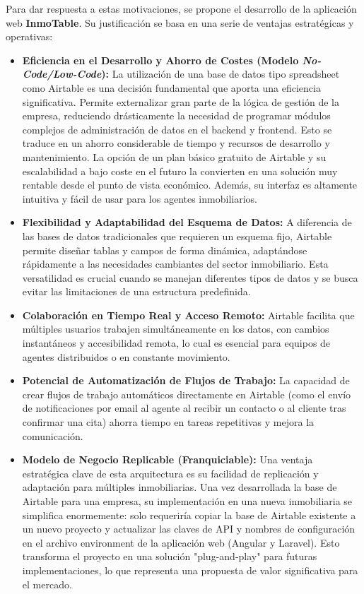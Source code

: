 Para dar respuesta a estas motivaciones, se propone el desarrollo de la aplicación web \textbf{InmoTable}. Su justificación se basa en una serie de ventajas estratégicas y operativas:

\begin{itemize}
    \item \textbf{Eficiencia en el Desarrollo y Ahorro de Costes (Modelo \textit{No-Code/Low-Code}):} La utilización de una base de datos tipo spreadsheet como Airtable es una decisión fundamental que aporta una eficiencia significativa. Permite externalizar gran parte de la lógica de gestión de la empresa, reduciendo drásticamente la necesidad de programar módulos complejos de administración de datos en el backend y frontend. Esto se traduce en un ahorro considerable de tiempo y recursos de desarrollo y mantenimiento. La opción de un plan básico gratuito de Airtable y su escalabilidad a bajo coste en el futuro la convierten en una solución muy rentable desde el punto de vista económico. Además, su interfaz es altamente intuitiva y fácil de usar para los agentes inmobiliarios.
    \item \textbf{Flexibilidad y Adaptabilidad del Esquema de Datos:} A diferencia de las bases de datos tradicionales que requieren un esquema fijo, Airtable permite diseñar tablas y campos de forma dinámica, adaptándose rápidamente a las necesidades cambiantes del sector inmobiliario. Esta versatilidad es crucial cuando se manejan diferentes tipos de datos y se busca evitar las limitaciones de una estructura predefinida.
    \item \textbf{Colaboración en Tiempo Real y Acceso Remoto:} Airtable facilita que múltiples usuarios trabajen simultáneamente en los datos, con cambios instantáneos y accesibilidad remota, lo cual es esencial para equipos de agentes distribuidos o en constante movimiento.
    \item \textbf{Potencial de Automatización de Flujos de Trabajo:} La capacidad de crear flujos de trabajo automáticos directamente en Airtable (como el envío de notificaciones por email al agente al recibir un contacto o al cliente tras confirmar una cita) ahorra tiempo en tareas repetitivas y mejora la comunicación.
    \item \textbf{Modelo de Negocio Replicable (Franquiciable):} Una ventaja estratégica clave de esta arquitectura es su facilidad de replicación y adaptación para múltiples inmobiliarias. Una vez desarrollada la base de Airtable para una empresa, su implementación en una nueva inmobiliaria se simplifica enormemente: solo requeriría copiar la base de Airtable existente a un nuevo proyecto y actualizar las claves de API y nombres de configuración en el archivo environment de la aplicación web (Angular y Laravel). Esto transforma el proyecto en una solución "plug-and-play" para futuras implementaciones, lo que representa una propuesta de valor significativa para el mercado.

\end{itemize}
